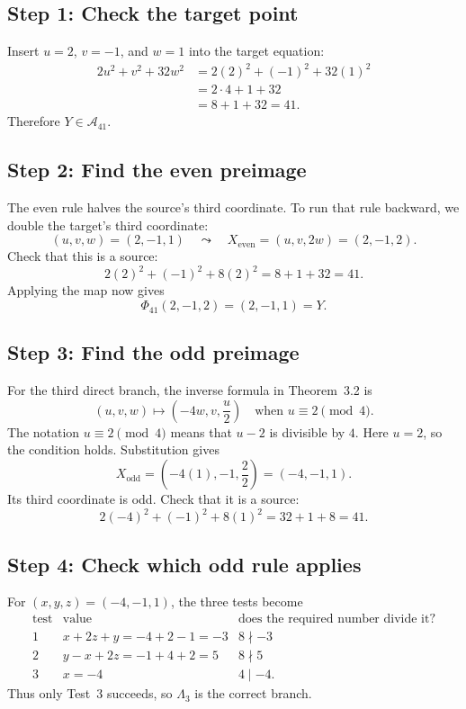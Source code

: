 \documentclass[11pt]{amsart}
\newcommand{\A}{\mathcal A_{41}}
\newcommand{\PhiMap}{\Phi_{41}}
\begin{document}
\subsection*{Step 1: Check the target point}

Insert \(u=2\), \(v=-1\), and \(w=1\) into the target equation:
\[
\begin{aligned}
 2u^2+v^2+32w^2
 &=2(2)^2+(-1)^2+32(1)^2\\
 &=2\cdot4+1+32\\
 &=8+1+32=41.
\end{aligned}
\]
Therefore \(Y\in\A\).

\subsection*{Step 2: Find the even preimage}

The even rule halves the source's third coordinate.  To run that rule
backward, we double the target's third coordinate:
\[
 (u,v,w)=(2,-1,1)
 \quad\leadsto\quad
 X_{\mathrm{even}}=(u,v,2w)=(2,-1,2).
\]
Check that this is a source:
\[
 2(2)^2+(-1)^2+8(2)^2=8+1+32=41.
\]
Applying the map now gives
\[
 \PhiMap(2,-1,2)=(2,-1,1)=Y.
\]

\subsection*{Step 3: Find the odd preimage}

For the third direct branch, the inverse formula in Theorem~3.2 is
\[
 (u,v,w)\longmapsto\left(-4w,v,\frac{u}{2}\right)
 \quad\text{when }u\equiv2\pmod4.
\]
The notation \(u\equiv2\pmod4\) means that \(u-2\) is divisible by \(4\).
Here \(u=2\), so the condition holds.  Substitution gives
\[
 X_{\mathrm{odd}}
 =\left(-4(1),-1,\frac{2}{2}\right)
 =(-4,-1,1).
\]
Its third coordinate is odd.  Check that it is a source:
\[
 2(-4)^2+(-1)^2+8(1)^2=32+1+8=41.
\]

\newpage
\subsection*{Step 4: Check which odd rule applies}

For \((x,y,z)=(-4,-1,1)\), the three tests become
\[
\begin{array}{c|c|c}
\text{test}&\text{value}&\text{does the required number divide it?}\\ \hline
1&x+2z+y=-4+2-1=-3&8\nmid-3\\
2&y-x+2z=-1+4+2=5&8\nmid5\\
3&x=-4&4\mid-4.
\end{array}
\]
Thus only Test~3 succeeds, so \(\Lambda_3\) is the correct branch.
\end{document}
